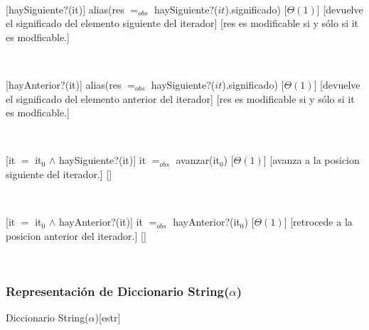 ~

[haySiguiente?(it)]
{alias(res $=_{obs}$ haySiguiente?($it$).significado)}
[$\Theta(1)$]
[devuelve el significado del elemento siguiente del iterador]
[res es modificable si y sólo si it es modficable.]

~


[hayAnterior?(it)]
{alias(res $=_{obs}$ haySiguiente?($it$).significado)}
[$\Theta(1)$]
[devuelve el significado del elemento anterior del iterador]
[res es modificable si y sólo si it es modficable.]

~

[it $=$ it$_0$ $\land$ haySiguiente?(it)]
{it $=_{obs}$ avanzar(it$_0$)}
[$\Theta(1)$]
[avanza a la posicion siguiente del iterador.]
[]

~

[it $=$ it$_0$ $\land$ hayAnterior?(it)]
{it $=_{obs}$ hayAnterior?(it$_0$)}
[$\Theta(1)$]
[retrocede a la posicion anterior del iterador.]
[]

~


\pagebreak

\subsubsection{Representación de Diccionario String($\alpha$)}

\begin{Estructura}{ Diccionario String($\alpha$)}[estr]
	\begin{Tupla}[estr]
	\end{Tupla}

	~

	\begin{Tupla}[Nodo]
	\end{Tupla}

\end{Estructura}

